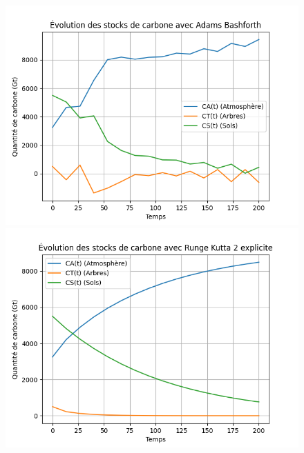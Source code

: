 \documentclass[12pt]{article}
\theoremstyle{saav}
\begin{document}
	
	\begin{figure}[h!]
		\centering
		
		\begin{minipage}[b]{0.45\textwidth}
			\centering
			\includegraphics[width=\linewidth]{images/stabilite_adams_bashforth.png}
		\end{minipage}
		\hfill
		\begin{minipage}[b]{0.45\textwidth}
			\centering
			\includegraphics[width=\linewidth]{images/stabilite_runge_kutta.png}
		\end{minipage}
		
		\vspace{0.5cm}
		

\end{figure}
\end{document}
